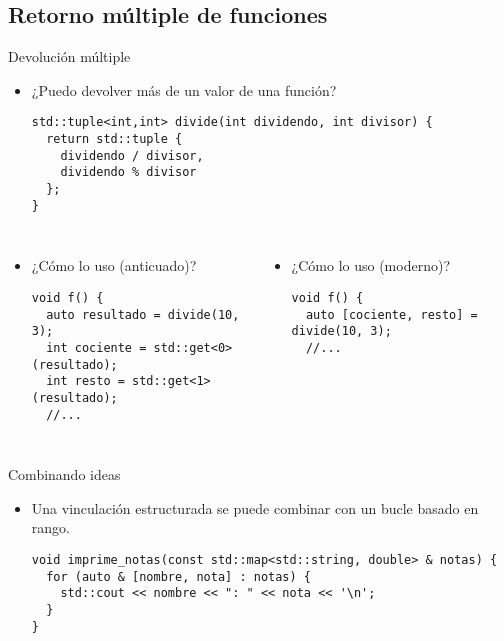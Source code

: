\subsection{Retorno múltiple de funciones}

\begin{frame}[t,fragile]{Devolución múltiple}
\begin{itemize}
  \item ¿Puedo devolver más de un valor de una función?\pause
\begin{lstlisting}
std::tuple<int,int> divide(int dividendo, int divisor) {
  return std::tuple {
    dividendo / divisor,
    dividendo % divisor
  };
}
\end{lstlisting}
\end{itemize}

\begin{columns}[T]


\begin{itemize}
  \pause
  \item ¿Cómo lo uso (anticuado)?
\begin{lstlisting}
void f() {
  auto resultado = divide(10, 3);
  int cociente = std::get<0>(resultado);
  int resto = std::get<1>(resultado);
  //...
\end{lstlisting}
\end{itemize}

\begin{itemize}
  \pause
  \item ¿Cómo lo uso (moderno)?
\begin{lstlisting}
void f() {
  auto [cociente, resto] = divide(10, 3);
  //...
\end{lstlisting}
\end{itemize}

\end{columns}
\end{frame}

\begin{frame}[t,fragile]{Combinando ideas}
\begin{itemize}
  \item Una vinculación estructurada se puede combinar con un bucle
        basado en rango.
\begin{lstlisting}
void imprime_notas(const std::map<std::string, double> & notas) {
  for (auto & [nombre, nota] : notas) {
    std::cout << nombre << ": " << nota << '\n';
  }
}
\end{lstlisting}
\end{itemize}
\end{frame}
